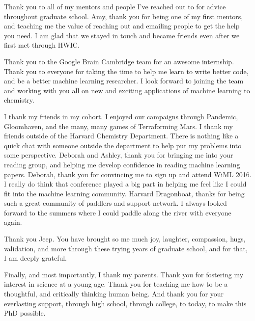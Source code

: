 Thank you to all of my mentors and people I've reached out to for advice throughout graduate school. Amy, thank you for being one of my first mentors, and teaching me the value of reaching out and emailing people to get the help you need. I am glad that we stayed in touch and became friends even after we first met through HWIC.

Thank you to the Google Brain Cambridge team for an awesome internship. Thank you to everyone for taking the time to help me learn to write better code, and be a better machine learning researcher. I look forward to joining the team and working with you all on new and exciting applications of machine learning to chemistry. 

I thank my friends in my cohort. I enjoyed our campaigns through Pandemic, Gloomhaven, and the many, many games of Terraforming Mars. 
I thank my friends outside of the Harvard Chemistry Department. There is nothing like a quick chat with someone outside the department to help put my problems into some perspective.
Deborah and Ashley, thank you for bringing me into your reading group, and helping me develop confidence in reading machine learning papers. Deborah, thank you for convincing me to sign up and attend WiML 2016. I really do think that conference played a big part in helping me feel like I could fit into the machine learning community.
Harvard Dragonboat, thanks for being such a great community of paddlers and support network. I always looked forward to the summers where I could paddle along the river with everyone again.

Thank you Jeep. You have brought so me much joy, laughter, compassion, hugs, validation, and more through these trying years of graduate school, and for that, I am deeply grateful.

Finally, and most importantly, I thank my parents. Thank you for fostering my interest in science at a young age. Thank you for teaching me how to be a thoughtful, and critically thinking human being. And thank you for your everlasting support, through high school, through college, to today, to make this PhD possible. 
